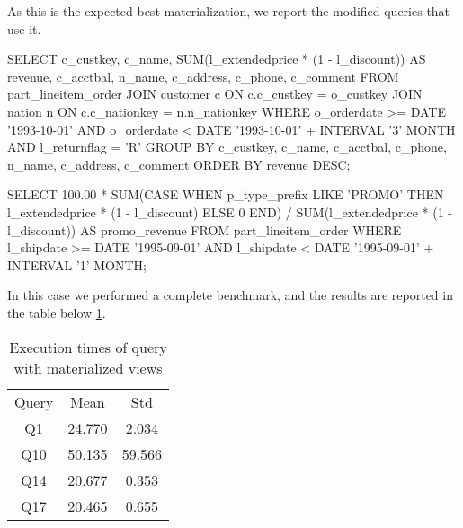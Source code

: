 As this is the expected best materialization, we report the modified queries that use it.

\begin{sql}[Query 10]
SELECT
    c_custkey,
    c_name,
    SUM(l_extendedprice * (1 - l_discount)) AS revenue,
    c_acctbal,
    n_name,
    c_address,
    c_phone,
    c_comment
FROM
    part_lineitem_order
    JOIN customer c ON c.c_custkey = o_custkey
    JOIN nation n ON c.c_nationkey = n.n_nationkey
WHERE
    o_orderdate >= DATE '1993-10-01'
    AND o_orderdate < DATE '1993-10-01' + INTERVAL '3' MONTH
    AND l_returnflag = 'R'
GROUP BY
    c_custkey,
    c_name,
    c_acctbal,
    c_phone,
    n_name,
    c_address,
    c_comment
ORDER BY
    revenue DESC;
\end{sql}

\begin{sql}[Query 14]
SELECT
    100.00 * SUM(CASE
        WHEN p_type_prefix LIKE 'PROMO'
        THEN l_extendedprice * (1 - l_discount)
        ELSE 0
    END) / SUM(l_extendedprice * (1 - l_discount)) AS promo_revenue
FROM
    part_lineitem_order
WHERE
    l_shipdate >= DATE '1995-09-01'
    AND l_shipdate < DATE '1995-09-01' + INTERVAL '1' MONTH;
\end{sql}


In this case we performed a complete benchmark, and the results are reported in the table below \ref{tab:materialize}.

\begin{table}[H]
\centering 
\begin{tabular}{c|c|c} 
\rowcolor{blue!50} Query & Mean & Std\\
\rowcolor{gray!10} Q1 &24.770 &2.034\\
\rowcolor{white} Q10 &50.135 &59.566\\
\rowcolor{gray!10} Q14 &20.677 &0.353\\
\rowcolor{white} Q17 &20.465 &0.655\\
\end{tabular}\\[0.5cm] 
\caption{Execution times of query with materialized views} 
\label{tab:materialize} 
\end{table}



